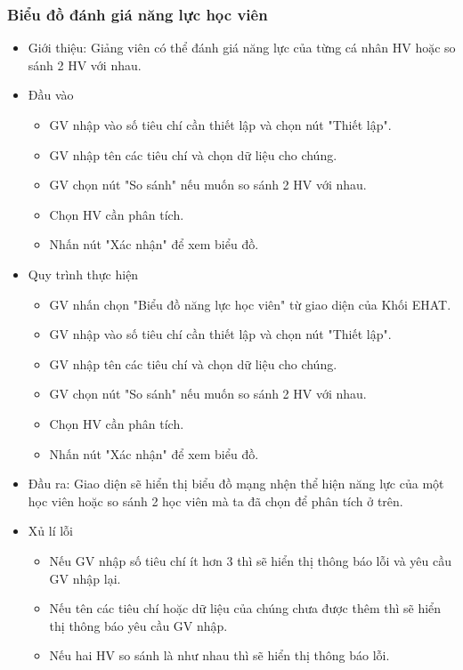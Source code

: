 \subsubsection{Biểu đồ đánh giá năng lực học viên}
\begin{itemize}
	\item Giới thiệu: Giảng viên có thể đánh giá năng lực của từng cá nhân HV hoặc so sánh 2 HV với nhau.
	\item Đầu vào
	\begin{itemize}
		\item GV nhập vào số tiêu chí cần thiết lập và chọn nút "Thiết lập".
		\item GV nhập tên các tiêu chí và chọn dữ liệu cho chúng.
		\item GV chọn nút "So sánh" nếu muốn so sánh 2 HV với nhau.
		\item Chọn HV cần phân tích.
		\item Nhấn nút "Xác nhận" để xem biểu đồ.
	\end{itemize}
	\item Quy trình thực hiện
	\begin{itemize}
		\item GV nhấn chọn "Biểu đồ năng lực học viên" từ giao diện của Khối EHAT.
		\item GV nhập vào số tiêu chí cần thiết lập và chọn nút "Thiết lập".
		\item GV nhập tên các tiêu chí và chọn dữ liệu cho chúng.
		\item GV chọn nút "So sánh" nếu muốn so sánh 2 HV với nhau.
		\item Chọn HV cần phân tích.
		\item Nhấn nút "Xác nhận" để xem biểu đồ.
	\end{itemize}
	\item Đầu ra: Giao diện sẽ hiển thị biểu đồ mạng nhện thể hiện năng lực của một học viên hoặc so sánh 2 học viên mà ta đã chọn để phân tích ở trên.
	\item Xủ lí lỗi
	\begin{itemize}
		\item Nếu GV nhập số tiêu chí ít hơn 3 thì sẽ hiển thị thông báo lỗi và yêu cầu GV nhập lại.
		\item Nếu tên các tiêu chí hoặc dữ liệu của chúng chưa được thêm thì sẽ hiển thị thông báo yêu cầu GV nhập.
		\item Nếu hai HV so sánh là như nhau thì sẽ hiển thị thông báo lỗi.
	\end{itemize}
\end{itemize}

